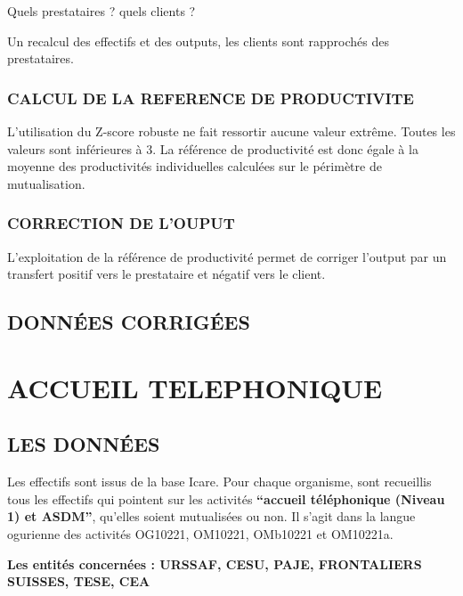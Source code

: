 \documentclass[
]{book}
\begin{document}
Quels prestataires ? quels clients ?

Un recalcul des effectifs et des outputs, les clients sont rapprochés des prestataires.

\hypertarget{calcul-de-la-reference-de-productivite}{%
\subsection{CALCUL DE LA REFERENCE DE PRODUCTIVITE}\label{calcul-de-la-reference-de-productivite}}

L'utilisation du Z-score robuste ne fait ressortir aucune valeur extrême. Toutes les valeurs sont inférieures à 3.
La référence de productivité est donc égale à la moyenne des productivités individuelles calculées sur le périmètre de mutualisation.

\hypertarget{correction-de-louput}{%
\subsection{CORRECTION DE L'OUPUT}\label{correction-de-louput}}

L'exploitation de la référence de productivité permet de corriger l'output par un transfert positif vers le prestataire et négatif vers le client.

\hypertarget{donnuxe9es-corriguxe9es}{%
\section{DONNÉES CORRIGÉES}\label{donnuxe9es-corriguxe9es}}

\hypertarget{accueil-telephonique}{%
\chapter{ACCUEIL TELEPHONIQUE}\label{accueil-telephonique}}

\hypertarget{les-donnuxe9es-1}{%
\section{LES DONNÉES}\label{les-donnuxe9es-1}}

Les effectifs sont issus de la base Icare. Pour chaque organisme, sont recueillis tous les effectifs qui pointent sur les activités \textbf{``accueil téléphonique (Niveau 1) et ASDM''}, qu'elles soient mutualisées ou non. Il s'agit dans la langue ogurienne des activités OG10221, OM10221, OMb10221 et OM10221a.

\textbf{Les entités concernées : URSSAF, CESU, PAJE, FRONTALIERS SUISSES, TESE, CEA }
\end{document}
